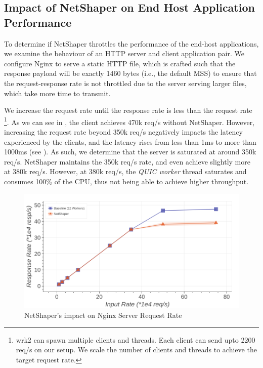 \subsection{Impact of NetShaper on End Host Application Performance}
\label{subsec:netshaper-evaluation-http-reqs}

To determine if NetShaper throttles the performance of the end-host applications, we examine the behaviour of an HTTP server and client application pair.
We configure Nginx to serve a static HTTP file, which is crafted such that the response payload will be exactly 1460 bytes (i.e., the default MSS) to ensure that the request-response rate is not throttled due to the server serving larger files, which take more time to transmit.

We increase the request rate until the response rate is less than the request rate~
\footnote{wrk2 can spawn multiple clients and threads. Each client can send upto 2200 req/s on our setup. We scale the number of clients and threads to achieve the target request rate.}.
As we can see in , the client achieves 470k req/s without NetShaper.
However, increasing the request rate beyond 350k req/s negatively impacts the latency experienced by the clients, and the latency rises from less than 1ms to more than 1000ms (see ).
As such, we determine that the server is saturated at around 350k req/s.
NetShaper maintains the 350k req/s rate, and even achieve slightly more at 380k req/s.
However, at 380k req/s, the \textit{QUIC worker} thread saturates and consumes 100\% of the CPU, thus not being able to achieve higher throughput.


\begin{figure}[!htb]
    \centering
    \includegraphics[width=\columnwidth]{figures/netshaper/evaluation/http_reqs.png}
    \caption{NetShaper's impact on Nginx Server Request Rate}
    \label{fig:netshaper-eval-http-reqs}
\end{figure}

